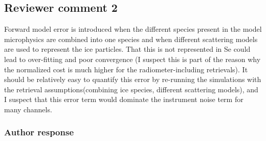 \documentclass[11pt]{scrartcl}
\providecommand{\DIFadd}[1]{{\protect\textcolor{blue}{\uwave{#1}}}} %
\providecommand{\DIFdel}[1]{{\protect\textcolor{red}{\sout{#1}}}}                      %
\providecommand{\DIFaddbegin}{} %
\providecommand{\DIFaddend}{} %
\providecommand{\DIFdelbegin}{} %
\providecommand{\DIFdelend}{} %
\newenvironment{change}[1][]{%
  \begin{mdframed}[frametitle={Line #1:}]%
}{%
  \end{mdframed}%
}
\begin{document}
%
%
%

\subsection*{Reviewer comment 2}

Forward model error is introduced when the different species present in the
model microphysics are combined into one species and when different scattering
models are used to represent the ice particles. That this is not represented in
Se could lead to over-fitting and poor convergence (I suspect this is part of
the reason why the normalized cost is much higher for the radiometer-including
retrievals). It should be relatively easy to quantify this error by re-running
the simulations with the retrieval assumptions(combining ice species, different
scattering models), and I suspect that this error term would dominate the
instrument noise term for many channels.

\subsubsection*{Author response}
\end{document}
